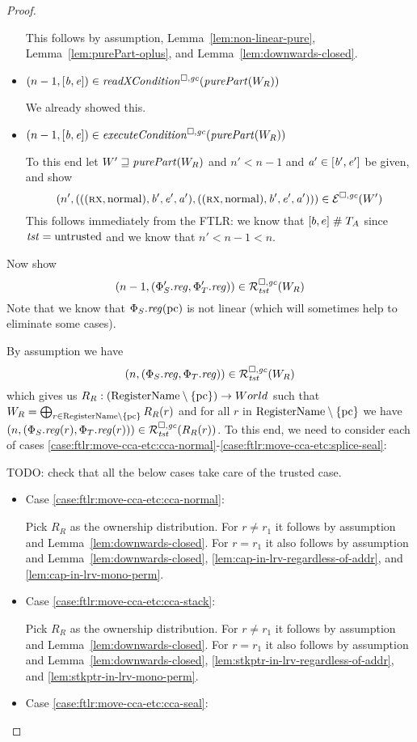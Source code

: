 \begin{proof}
\begin{itemize}
    This follows by assumption, Lemma~\ref{lem:non-linear-pure}, Lemma~\ref{lem:purePart-oplus}, and Lemma~\ref{lem:downwards-closed}.
  \item $\npair[n-1]{[\baddr,\eaddr]} \in \xReadCond{}(\purePart{W_R})$

    We already showed this.
  \item $\npair[n-1]{[\baddr,\eaddr]} \in \execCond{}(\purePart{W_R})$

    To this end let $W' \future \purePart{W_R}$ and $n' < n-1$ and $\aaddr' \in [\baddr',\eaddr']$ be given, and show
    \[
      \npair[n']{(((\rx,\normal),\baddr',\eaddr',\aaddr'),((\rx,\normal),\baddr',\eaddr',\aaddr'))} \in \lre(W')
    \]
    This follows immediately from the FTLR: we know that $[b,e] \mathrel{\#} \ta$ since $\trust = \untrusted$ and we know that $n' < n - 1 < n$.
  \end{itemize}
  
  Now show
  \[
    \npair[n-1]{(\Phi_S'.\reg,\Phi_T'.\reg)} \in \lrrg{\trust}(W_R)
  \]
  Note that we know that $\Phi_S.\reg(\pcreg)$ is not linear (which will sometimes help to eliminate some cases).

  By assumption we have
  \[
    \npair[n]{(\Phi_S.\reg,\Phi_T.\reg)} \in \lrrg{\trust}(W_R)
  \]
  which gives us $R_R : (\RegName \setminus \{\pcreg\}) \fun World$ such that $W_R = \bigoplus_{r\in \RegName \setminus \{\pcreg\}} R_R(r)$ and for all $r$ in $\RegName \setminus \{\pcreg\}$ we have $\npair[n]{(\Phi_S.\reg(r),\Phi_T.\reg(r))} \in \lrrg{\trust}(R_R(r))$.
  To this end, we need to consider each of cases
  \ref{case:ftlr:move-cca-etc:cca-normal}-\ref{case:ftlr:move-cca-etc:splice-seal}:

  TODO: check that all the below cases take care of the trusted case.
  \begin{itemize}
  \item Case \ref{case:ftlr:move-cca-etc:cca-normal}:

    Pick $R_R$ as the ownership distribution.
    For $r \neq r_1$ it follows by assumption and Lemma~\ref{lem:downwards-closed}.
    For $r = r_1$ it also follows by assumption and Lemma~\ref{lem:downwards-closed}, \ref{lem:cap-in-lrv-regardless-of-addr}, and \ref{lem:cap-in-lrv-mono-perm}.
  \item Case \ref{case:ftlr:move-cca-etc:cca-stack}:

    Pick $R_R$ as the ownership distribution.
    For $r \neq r_1$ it follows by assumption and Lemma~\ref{lem:downwards-closed}.
    For $r = r_1$ it also follows by assumption and Lemma~\ref{lem:downwards-closed}, \ref{lem:stkptr-in-lrv-regardless-of-addr}, and \ref{lem:stkptr-in-lrv-mono-perm}.
  \item Case \ref{case:ftlr:move-cca-etc:cca-seal}:


\end{itemize}
\end{proof}
